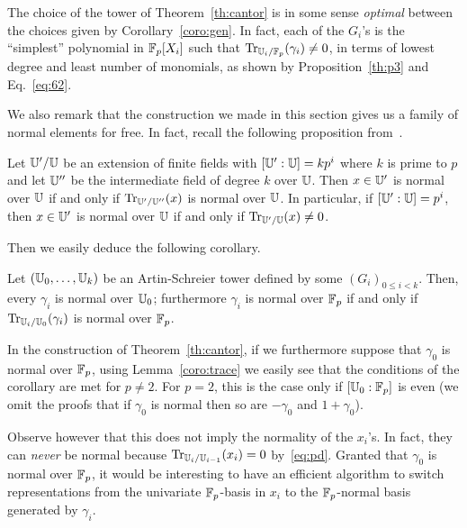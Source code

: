 \begin{remark}
  The choice of the tower of Theorem~\ref{th:cantor} is in some sense
  \emph{optimal} between the choices given by
  Corollary~\ref{coro:gen}. In fact, each of the $G_i$'s is the
  ``simplest'' polynomial in $\mathbb{F}_p[X_i]$ such that
  $\operatorname{Tr}_{\mathbb{U}_i/\mathbb{F}_p}(\gamma_i)\ne0$, in terms of lowest degree and least
  number of monomials, as shown by Proposition~\ref{th:p3} and
  Eq.~\eqref{eq:62}.
\end{remark}

We also remark that the construction we made in this section gives us
a family of normal elements for free. In fact, recall the following
proposition from~\cite[Section~5]{hachenberger}.
\begin{proposition}
  Let $\mathbb{U}'/\mathbb{U}$ be an extension of finite fields with $[\mathbb{U}':\mathbb{U}]=kp^i$
  where $k$ is prime to $p$ and let $\mathbb{U}''$ be the intermediate field
  of degree $k$ over $\mathbb{U}$. Then $x\in\mathbb{U}'$ is normal over $\mathbb{U}$ if and
  only if $\operatorname{Tr}_{\mathbb{U}'/\mathbb{U}''}(x)$ is normal over $\mathbb{U}$. In particular, if
  $[\mathbb{U}':\mathbb{U}]=p^i$, then $x\in\mathbb{U}'$ is normal over $\mathbb{U}$ if and only if
  $\operatorname{Tr}_{\mathbb{U}'/\mathbb{U}}(x)\ne0$.
\end{proposition}
Then we easily deduce the following corollary.
\begin{corollary}
  Let $(\mathbb{U}_0,\ldots,\mathbb{U}_k)$ be an Artin-Schreier tower defined by some
  $(G_i)_{0\le i<k}$. Then, every $\gamma_i$ is normal over $\mathbb{U}_0$;
  furthermore $\gamma_i$ is normal over $\mathbb{F}_p$ if and only if
  $\operatorname{Tr}_{\mathbb{U}_i/\mathbb{U}_0}(\gamma_i)$ is normal over $\mathbb{F}_p$.
\end{corollary}

In the construction of Theorem~\ref{th:cantor}, if we furthermore
suppose that $\gamma_0$ is normal over $\mathbb{F}_p$, using
Lemma~\ref{coro:trace} we easily see that the conditions of the
corollary are met for $p\ne2$.  For $p=2$, this is the case only if
$[\mathbb{U}_0:\mathbb{F}_p]$ is even (we omit the proofs that if $\gamma_0$ is normal
then so are $-\gamma_0$ and $1+\gamma_0$).

\begin{remark}
  Observe however that this does not imply the normality of the
  $x_i$'s. In fact, they can {\em never} be normal because
  $\operatorname{Tr}_{\mathbb{U}_i/\mathbb{U}_{i-1}}(x_i) = 0$ by~\ref{eq:pd}.  Granted that
  $\gamma_0$ is normal over $\mathbb{F}_p$, it would be interesting to have an
  efficient algorithm to switch representations from the univariate
  $\mathbb{F}_p$-basis in $x_i$ to the $\mathbb{F}_p$-normal basis generated by
  $\gamma_i$.
\end{remark}


%
